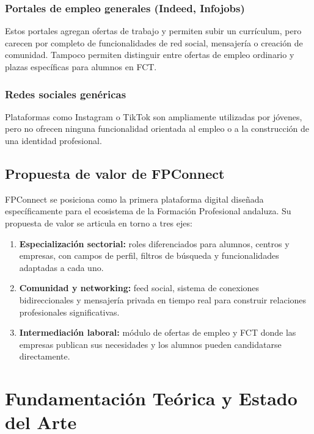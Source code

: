 \documentclass[a4paper]{report}
\begin{document}
\subsection{Portales de empleo generales (Indeed, Infojobs)}

Estos portales agregan ofertas de trabajo y permiten subir un currículum, pero carecen por completo de funcionalidades de red social, mensajería o creación de comunidad. Tampoco permiten distinguir entre ofertas de empleo ordinario y plazas específicas para alumnos en FCT.

\subsection{Redes sociales genéricas}

Plataformas como Instagram o TikTok son ampliamente utilizadas por jóvenes, pero no ofrecen ninguna funcionalidad orientada al empleo o a la construcción de una identidad profesional.

\section{Propuesta de valor de FPConnect}

FPConnect se posiciona como la primera plataforma digital diseñada específicamente para el ecosistema de la Formación Profesional andaluza. Su propuesta de valor se articula en torno a tres ejes:

\begin{enumerate}
  \item \textbf{Especialización sectorial:} roles diferenciados para alumnos, centros y empresas, con campos de perfil, filtros de búsqueda y funcionalidades adaptadas a cada uno.
  \item \textbf{Comunidad y networking:} feed social, sistema de conexiones bidireccionales y mensajería privada en tiempo real para construir relaciones profesionales significativas.
  \item \textbf{Intermediación laboral:} módulo de ofertas de empleo y FCT donde las empresas publican sus necesidades y los alumnos pueden candidatarse directamente.
\end{enumerate}

\newpage

\chapter{Fundamentación Teórica y Estado del Arte}
\end{document}

